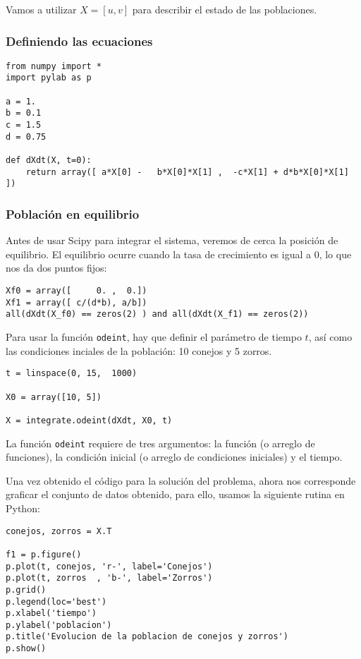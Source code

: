 \begin{frame}
Vamos a utilizar $X = [u, v]$ para describir el estado de las poblaciones.
\end{frame}
\begin{frame}[fragile]
\frametitle{Definiendo las ecuaciones}
\begin{lstlisting}
from numpy import *
import pylab as p

a = 1.
b = 0.1
c = 1.5
d = 0.75

def dXdt(X, t=0):
    return array([ a*X[0] -   b*X[0]*X[1] ,  -c*X[1] + d*b*X[0]*X[1] ])
\end{lstlisting}
\end{frame}
\begin{frame}[fragile]
\frametitle{Poblaci\'{o}n en equilibrio}
Antes de usar Scipy para integrar el sistema, veremos de cerca la posici\'{o}n de equilibrio. El equilibrio ocurre cuando la tasa de crecimiento es igual a 0, lo que nos da dos puntos fijos:
\begin{lstlisting}
Xf0 = array([     0. ,  0.])
Xf1 = array([ c/(d*b), a/b])
all(dXdt(X_f0) == zeros(2) ) and all(dXdt(X_f1) == zeros(2))
\end{lstlisting}
\end{frame}
\begin{frame}[fragile]
Para usar la funci\'{o}n \texttt{odeint}, hay que definir el par\'{a}metro de tiempo $t$, as\'{i} como las condiciones inciales de la poblaci\'{o}n: 10 conejos y 5 zorros.
\begin{lstlisting}
t = linspace(0, 15,  1000)
              
X0 = array([10, 5])         
            
X = integrate.odeint(dXdt, X0, t)
\end{lstlisting}
La funci\'{o}n \texttt{odeint} requiere de tres argumentos: la funci\'{o}n (o arreglo de funciones), la condici\'{o}n inicial (o arreglo de condiciones iniciales) y el tiempo.
\end{frame}
\begin{frame}[fragile]
Una vez obtenido el c\'{o}digo para la soluci\'{o}n del problema, ahora nos corresponde graficar el conjunto de datos obtenido, para ello, usamos la siguiente rutina en Python:
\begin{lstlisting}
conejos, zorros = X.T

f1 = p.figure()
p.plot(t, conejos, 'r-', label='Conejos')
p.plot(t, zorros  , 'b-', label='Zorros')
p.grid()
p.legend(loc='best')
p.xlabel('tiempo')
p.ylabel('poblacion')
p.title('Evolucion de la poblacion de conejos y zorros')
p.show()
\end{lstlisting}
\end{frame}
